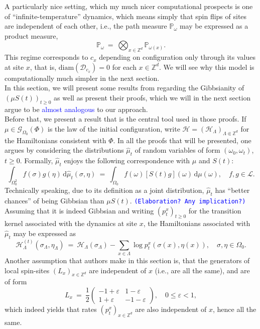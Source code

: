 \documentclass[12pt]{article}
\newcommand{\D}{\mathcal{D}}
\renewcommand{\d}{\mathrm{d}}
\newcommand{\G}{\mathcal{G}}
\renewcommand{\H}{\mathcal{H}}
\newcommand{\Loc}{\mathcal{L}}
\renewcommand{\P}{\mathbb{P}}
\newcommand{\Z}{\mathbb{Z}}
\newcommand{\1}{\mathbbm{1}}
\newcommand{\5}{\vspace{0.5cm}}
\renewcommand{\hat}{\widehat}
\theoremstyle{definition}
\begin{document}
A particularly nice setting, which my much nicer computational prospects is one of ``infinite-temperature'' dynamics, which means simply that spin flips of sites are independent of each other, i.e., the path measure $\P_\omega$ may be expressed as a product measure,
$$\P_\omega ~=~ \bigotimes_{x\in\Z^d}\P_{\omega(x)}.$$
This regime corresponds to $c_x$ depending on configuration only through its values at site $x$, that is, $\mathrm{diam}(\D_{c_x})=0$ for each $x\in\Z^d$. We will see why this model is computationally much simpler in the next section. \\

In this section, we will present some results from \cite{EFHR} regarding the Gibbsianity of $(\mu S(t))_{t\geq 0}$ as well as present their proofs, which we will in the next section argue to be \textcolor{blue}{almost analogous} to our approach. \\

Before that, we present a result that is the central tool used in those proofs. If $\mu\in\G_{\Omega_0}(\Phi)$ is the law of the initial configuration, write $\H=(\H_\Lambda)_{\Lambda\Subset\Z^d}$ for the Hamiltonians consistent with $\Phi$. In all the proofs that will be presented, one argues by considering the distributions $\hat{\mu}_t$ of random variables of form $(\omega_0,\omega_t)$, $t\geq 0$. Formally, $\hat{\mu}_t$ enjoys the following correspondence with $\mu$ and $S(t)$:
$$\int_{\Omega_0^2} f(\sigma)g(\eta)\,\d\hat{\mu}_t(\sigma,\eta) ~=~ \int_{\Omega_0}f(\omega)[S(t)g](\omega)\,\d\mu(\omega), \quad f,g\in\Loc.$$
Technically speaking, due to its definition as a joint distribution, $\hat{\mu}_t$ has ``better chances'' of being Gibbsian than $\mu S(t)$. \textcolor{blue}{\texttt{(Elaboration? Any implication?)}} Assuming that it is indeed Gibbsian and writing $(p_t^x)_{t\geq 0}$ for the transition kernel associated with the dynamics at site $x$, the Hamiltonians associated with $\hat{\mu}_t$ may be expressed as
$$\H_\Lambda^{(t)}(\sigma_\Lambda,\eta_\Lambda) ~=~ \H_\Lambda(\sigma_\Lambda) - \sum_{x\in\Lambda}\log p_t^x(\sigma(x),\eta(x)), \quad \sigma,\eta\in\Omega_0.$$
Another assumption that authors make in this section is, that the generators of local spin-sites $(L_x)_{x\in\Z^d}$ are independent of $x$ (i.e., are all the same), and are of form
$$L_x ~=~ \frac{1}{2}\begin{pmatrix}
-1+\varepsilon & 1-\varepsilon \\
1+\varepsilon & -1-\varepsilon
\end{pmatrix}, \quad 0\leq \varepsilon<1,$$
which indeed yields that rates $(p_t^x)_{x\in\Z^d}$ are also independent of $x$, hence all the same.\\
\end{document}
